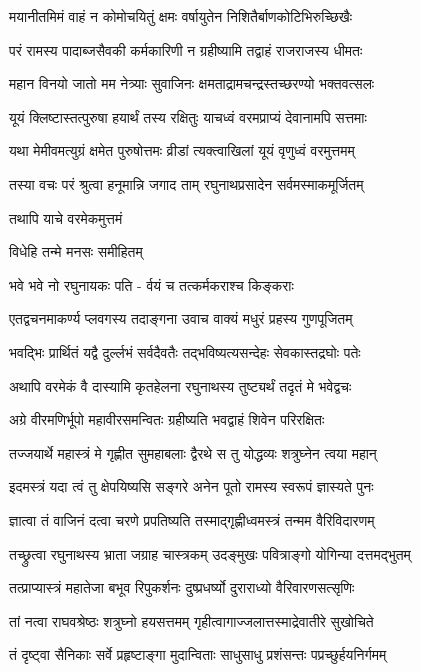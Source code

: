\twolineshloka
{मयानीतमिमं वाहं न कोमोचयितुं क्षमः}
{वर्षायुतेन निशितैर्बाणकोटिभिरुच्छिखैः}%

\twolineshloka
{परं रामस्य पादाब्जसैवकी कर्मकारिणी}
{न ग्रहीष्यामि तद्वाहं राजराजस्य धीमतः}%

\twolineshloka
{महान विनयो जातो मम नेत्र्याः सुवाजिनः}
{क्षमताद्रामचन्द्रस्तच्छरण्यो भक्तवत्सलः}%

\twolineshloka
{यूयं क्लिष्टास्तत्पुरुषा हयार्थं तस्य रक्षितुः}
{याचध्वं वरमप्राप्यं देवानामपि सत्तमाः}%

\twolineshloka
{यथा मेमीवमत्युग्रं क्षमेत पुरुषोत्तमः}
{व्रीडां त्यक्त्वाखिलां यूयं वृणुध्वं वरमुत्तमम्}%

\twolineshloka
{तस्या वचः परं श्रुत्वा हनूमान्नि जगाद ताम्}
{रघुनाथप्रसादेन सर्वमस्माकमूर्जितम्}%

तथापि याचे वरमेकमुत्तमं

विधेहि तन्मे मनसः समीहितम्

\twolineshloka
{भवे भवे नो रघुनायकः पति -}
{र्वयं च तत्कर्मकराश्च किङ्कराः}%

\twolineshloka
{एतद्वचनमाकर्ण्य प्लवगस्य तदाङ्गना}
{उवाच वाक्यं मधुरं प्रहस्य गुणपूजितम्}%

\twolineshloka
{भवद्भिः प्रार्थितं यद्वै दुर्ल्लभं सर्वदैवतैः}
{तद्भविष्यत्यसन्देहः सेवकास्तद्रघोः पतेः}%

\twolineshloka
{अथापि वरमेकं वै दास्यामि कृतहेलना}
{रघुनाथस्य तुष्ट्यर्थं तदृतं मे भवेद्वचः}%

\twolineshloka
{अग्रे वीरमणिर्भूपो महावीरसमन्वितः}
{ग्रहीष्यति भवद्वाहं शिवेन परिरक्षितः}%

\twolineshloka
{तज्जयार्थे महास्त्रं मे गृह्णीत सुमहाबलाः}
{द्वैरथे स तु योद्धव्यः शत्रुघ्नेन त्वया महान्}%

\twolineshloka
{इदमस्त्रं यदा त्वं तु क्षेपयिष्यसि सङ्गरे}
{अनेन पूतो रामस्य स्वरूपं ज्ञास्यते पुनः}%

\twolineshloka
{ज्ञात्वा तं वाजिनं दत्वा चरणे प्रपतिष्यति}
{तस्माद्गृह्णीध्वमस्त्रं तन्मम वैरिविदारणम्}%

\twolineshloka
{तच्छ्रुत्वा रघुनाथस्य भ्राता जग्राह चास्त्रकम्}
{उदङ्मुखः पवित्राङ्गो योगिन्या दत्तमद्भुतम्}%

\twolineshloka
{तत्प्राप्यास्त्रं महातेजा बभूव रिपुकर्शनः}
{दुष्प्रधर्ष्यो दुराराध्यो वैरिवारणसत्सृणिः}%

\twolineshloka
{तां नत्वा राघवश्रेष्ठः शत्रुघ्नो हयसत्तमम्}
{गृहीत्वागाज्जलात्तस्माद्रेवातीरे सुखोचिते}%

\twolineshloka
{तं दृष्ट्वा सैनिकाः सर्वे प्रहृष्टाङ्गा मुदान्विताः}
{साधुसाधु प्रशंसन्तः पप्रच्छुर्हयनिर्गमम्}%


